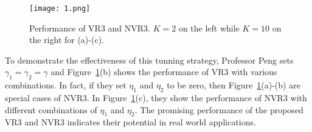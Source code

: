 \documentclass[twocolumn]{article}
\begin{document}
    \begin{figure}[ht]
    	\centering
    	\texttt{[image: 1.png]}
    	\caption{Performance of VR3 and NVR3. $K = 2$ on the left while $K = 10$ on the right for (a)-(c).}\label{Performance}
    \end{figure}

   To demonstrate the effectiveness of this tunning strategy, Professor Peng sets $\gamma_1=\gamma_2 = \gamma$ and Figure~\ref{Performance}(b) shows the performance of VR3 with various combinations. In fact, if they set $\eta_1$ and $\eta_2$ to be zero, then Figure~\ref{Performance}(a)-(b) are special cases of NVR3. In Figure~\ref{Performance}(c), they show the performance of NVR3 with different combinations of $\eta_1$ and $\eta_2$. The promising performance of the proposed VR3 and NVR3 indicates their potential in real world applications.

	
\end{document}
